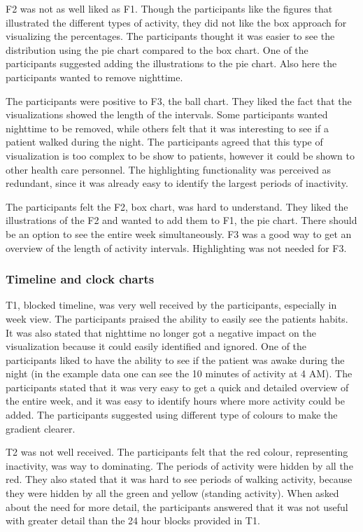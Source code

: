 F2 was not as well liked as F1. Though the participants like the figures that illustrated the different types of activity, they did not like the box approach for visualizing the percentages. The participants thought it was easier to see the distribution using the pie chart compared to the box chart. One of the participants suggested adding the illustrations to the pie chart. Also here the participants wanted to remove nighttime.

The participants were positive to F3, the ball chart. They liked the fact that the visualizations showed the length of the intervals. Some participants wanted nighttime to be removed, while others felt that it was interesting to see if a patient walked during the night. The participants agreed that this type of visualization is too complex to be show to patients, however it could be shown to other health care personnel. The highlighting functionality was perceived as redundant, since it was already easy to identify the largest periods of inactivity.

The participants felt the F2, box chart, was hard to understand. They liked the illustrations of the F2 and wanted to add them to F1, the pie chart. There should be an option to see the entire week simultaneously. F3 was a good way to get an overview of the length of activity intervals. Highlighting was not needed for F3.

\subsubsection{Timeline and clock charts}
T1, blocked timeline, was very well received by the participants, especially in week view. The participants praised the ability to easily see the patients habits. It was also stated that nighttime no longer got a negative impact on the visualization because it could easily identified and ignored. One of the participants liked to have the ability to see if the patient was awake during the night (in the example data one can see the 10 minutes of activity at 4 AM). The participants stated that it was very easy to get a quick and detailed overview of the entire week, and it was easy to identify hours where more activity could be added. The participants suggested using different type of colours to make the gradient clearer.

T2 was not well received. The participants felt that the red colour, representing inactivity, was way to dominating. The periods of activity were hidden by all the red. They also stated that it was hard to see periods of walking activity, because they were hidden by all the green and yellow (standing activity). When asked about the need for more detail, the participants answered that it was not useful with greater detail than the 24 hour blocks provided in T1.

